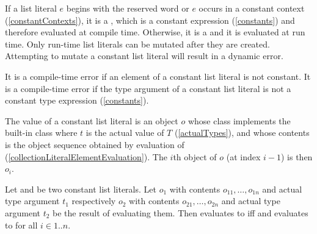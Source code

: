 \documentclass[makeidx]{article}
\begin{document}
{

\LMHash{}%
If a list literal $e$ begins with the reserved word \CONST{}
or $e$ occurs in a constant context
(\ref{constantContexts}),
it is a
,
which is a constant expression
(\ref{constants})
and therefore evaluated at compile time.
Otherwise, it is a
and it is evaluated at run time.
Only run-time list literals can be mutated
after they are created.
Attempting to mutate a constant list literal will result in a dynamic error.


\LMHash{}%
It is a compile-time error
if an element of a constant list literal is not constant.
It is a compile-time error if the type argument of a constant list literal
is not a constant type expression
(\ref{constants}).


\LMHash{}%
The value of a constant list literal
is an object $o$ whose class implements the built-in class
where $t$ is the actual value of $T$
(\ref{actualTypes}),
and whose contents is the object sequence  obtained by
evaluation of 
(\ref{collectionLiteralElementEvaluation}).
The $i$th object of $o$ (at index $i - 1$) is then $o_i$.

\LMHash{}%
Let 
and 
be two constant list literals.
Let $o_1$ with contents $o_{11}, \ldots, o_{1n}$ and actual type argument $t_1$
respectively
$o_2$ with contents $o_{21}, \ldots, o_{2n}$ and actual type argument $t_2$
be the result of evaluating them.
Then  evaluates to \TRUE{} if{}f
 and 
evaluates to \TRUE{} for all $i \in 1 .. n$.

}
\end{document}
